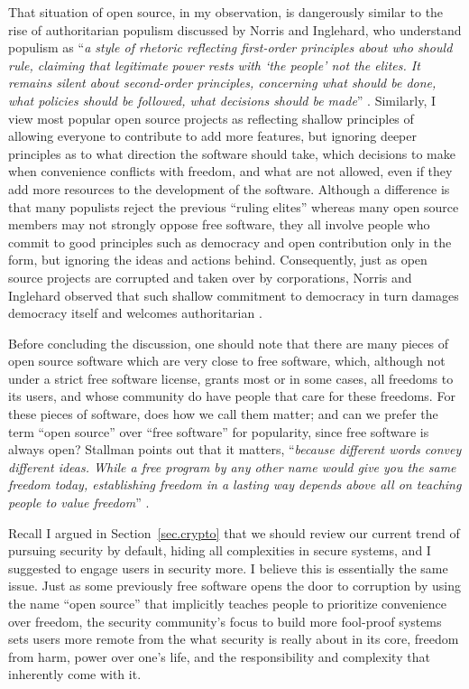 \documentclass[10pt]{article}
\begin{document}
That situation of open source, in my observation, is dangerously similar to the
rise of authoritarian populism discussed by Norris and Inglehard, who
understand populism as ``\emph{a style of rhetoric reflecting first-order
	principles about who should rule, claiming that legitimate power rests with
	`the people' not the elites. It remains silent about second-order
	principles, concerning what should be done, what policies should be
followed, what decisions should be made}'' \cite[p.~4]{cultural.backlash}.
Similarly, I view most popular open source projects as reflecting shallow
principles of allowing everyone to contribute to add more features, but
ignoring deeper principles as to what direction the software should take, which
decisions to make when convenience conflicts with freedom, and what are not
allowed, even if they add more resources to the development of the software.
Although a difference is that many populists reject the previous ``ruling
elites'' whereas many open source members may not strongly oppose free
software, they all involve people who commit to good principles such as
democracy and open contribution only in the form, but ignoring the ideas and
actions behind.  Consequently, just as open source projects are corrupted and
taken over by corporations, Norris and Inglehard observed that such shallow
commitment to democracy in turn damages democracy itself and welcomes
authoritarian \cite{cultural.backlash}.

Before concluding the discussion, one should note that there are many pieces of
open source software which are very close to free software, which, although not
under a strict free software license, grants most or in some cases, all
freedoms to its users, and whose community do have people that care for these
freedoms. For these pieces of software, does how we call them matter; and can
we prefer the term ``open source'' over ``free software'' for popularity, since
free software is always open?  Stallman points out that it matters,
``\emph{because different words convey different ideas. While a free program by
any other name would give you the same freedom today, establishing freedom in a
lasting way depends above all on teaching people to value freedom}''
\cite[Essay~14]{stallman.essays}. 

Recall I argued in Section~\ref{sec.crypto} that we should review our current
trend of pursuing security by default, hiding all complexities in secure
systems, and I suggested to engage users in security more. I believe this is
essentially the same issue. Just as some previously free software opens the
door to corruption by using the name ``open source'' that implicitly teaches
people to prioritize convenience over freedom, the security community's focus
to build more fool-proof systems sets users more remote from the what security
is really about in its core, freedom from harm, power over one's life, and the
responsibility and complexity that inherently come with it.
\end{document}
